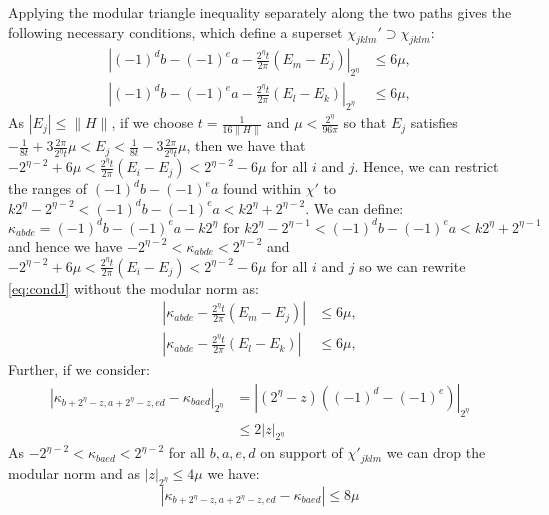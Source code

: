 \documentclass[aps,floatfix,10pt,amssymb,amsfont,amsmath,superscriptaddress,float,nofootinbib,longbibliography,nobalancelastpage,twocolumn]{revtex4-2}
\begin{document}
Applying the modular triangle inequality separately along the two paths gives the following necessary conditions, which define a superset $\chi_{jklm}'\supset\chi_{jklm}$:
\begin{equation}
\label{eq:condJ}
\begin{aligned}
    \left|(-1)^db -(-1)^ea-\frac{2^{\eta}t}{2\pi}(E_m-E_j)\right|_{2^{\eta}}&\leq 6\mu,\\
    \left|(-1)^db -(-1)^ea-\frac{2^{\eta}t}{2\pi}(E_l-E_k)\right|_{2^{\eta}}&\leq 6\mu,
\end{aligned}
\end{equation}
As $|E_j| \leq \|H\|$, if we choose $t = \frac{1}{16\|H\|}$ and $\mu < \frac{2^{\eta}}{96\pi}$ so that $E_j$ satisfies $-\frac{1}{8t} + 3\frac{2\pi}{2^{\eta}t}\mu < E_j < \frac{1}{8t} - 3\frac{2\pi}{2^{\eta}t}\mu$, then we have that $-2^{\eta-2}+6\mu < \frac{2^{\eta}t}{2\pi}(E_i -E_j) < 2^{\eta-2}-6\mu$ for all $i$ and $j$. Hence, we can restrict the ranges of $(-1)^db-(-1)^ea$ found within $\chi'$ to $k2^{\eta} - 2^{\eta-2}< (-1)^db-(-1)^ea < k2^{\eta} + 2^{\eta-2}$.
We can define:
\begin{equation}
    \kappa_{abde} = (-1)^db-(-1)^ea-k2^{\eta} \text{ for } k2^{\eta} - 2^{\eta-1}< (-1)^db-(-1)^ea < k2^{\eta} + 2^{\eta-1}
\end{equation}
and hence we have $-2^{\eta-2}<\kappa_{abde} < 2^{\eta-2}$ and $-2^{\eta-2}+6\mu < \frac{2^{\eta}t}{2\pi}(E_i -E_j) < 2^{\eta-2}-6\mu$ for all $i$ and $j$ so we can rewrite \eqref{eq:condJ} without the modular norm as:
\begin{equation}
    \begin{aligned}
    \left|\kappa_{abde}-\frac{2^{\eta}t}{2\pi}(E_m-E_j)\right|&\leq 6\mu,\\
    \left|\kappa_{abde}-\frac{2^{\eta}t}{2\pi}(E_l-E_k)\right|&\leq 6\mu,
\end{aligned}
\label{eq:kappaclose}
\end{equation}
Further, if we consider:
\begin{align}
    \left|\kappa_{b+2^{\eta}-z,a+2^{\eta}-z,ed} - \kappa_{baed}\right|_{2^{\eta}} &= |(2^{\eta}-z)((-1)^d-(-1)^e)|_{2^{\eta}}\\
    &\leq 2|z|_{2^\eta}
\end{align}
As $-2^{\eta-2}<\kappa_{baed} < 2^{\eta-2}$ for all $b,a,e,d$ on support of $\chi'_{jklm}$ we can drop the modular norm and as $|z|_{2^\eta} \leq 4\mu$ we have:
\begin{equation}
    \left|\kappa_{b+2^{\eta}-z,a+2^{\eta}-z,ed} - \kappa_{baed}\right| \leq 8\mu
    \label{eq:kappap2identity}
\end{equation}
\end{document}
